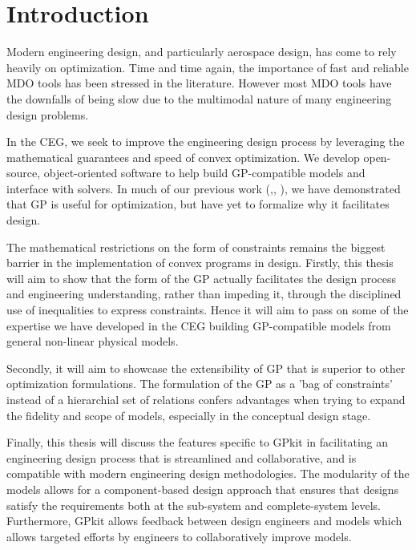 \chapter{Introduction}

Modern engineering design, and particularly aerospace design, has come to rely
heavily on optimization. Time and time again, the importance of fast and
reliable MDO tools has been stressed in the literature. However most MDO tools
have the downfalls of being slow due to the multimodal nature of many
engineering design problems.
	
In the \gls{CEG}, we seek to improve the engineering design process by
leveraging the mathematical guarantees and speed of convex optimization. We develop
open-source, object-oriented software to help build \gls{GP}-compatible models and
interface with solvers. In much of our previous work
(\cite{gp_ac_design},\cite{SP_ac_design}, \cite{sp_engine}), we have demonstrated that
\gls{GP} is useful for optimization, but have yet to formalize why it
facilitates design.
 
The mathematical restrictions on the form of constraints remains the biggest
barrier in the implementation of convex programs in design. Firstly, this thesis
will aim to show that the form of the GP actually facilitates the design process
and engineering understanding, rather than impeding it, through the disciplined use
of inequalities to express constraints. Hence it will aim to
pass on some of the expertise we have developed in the \gls{CEG} building
\gls{GP}-compatible models from general non-linear physical models. 

Secondly, it will aim to showcase the extensibility of \gls{GP} that is superior 
to other optimization formulations. The formulation of the \gls{GP} as a 'bag of 
constraints' instead of a hierarchial set of relations confers advantages 
when trying to expand the fidelity and scope of models, especially in the 
conceptual design stage. 

Finally, this thesis will discuss the features specific to GPkit in facilitating
an engineering design process that is streamlined and collaborative, and is
compatible with modern engineering design methodologies. The modularity of the 
models allows for a component-based design approach that ensures that designs 
satisfy the requirements both at the sub-system and complete-system levels. 
Furthermore, GPkit allows feedback between design engineers and models
which allows targeted efforts by engineers to collaboratively improve models.

